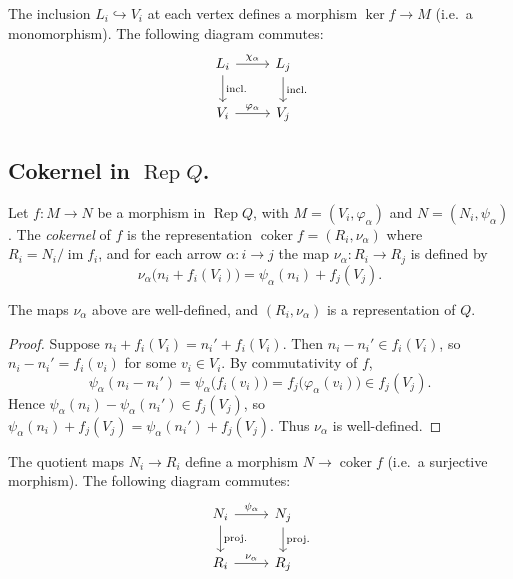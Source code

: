 \documentclass[11pt, a4paper]{report}
\begin{document}
\begin{remark}
    The inclusion \(L_i \hookrightarrow V_i\) at each vertex defines a morphism \(\operatorname{ker}f \to M\) (i.e.\ a monomorphism). The following diagram commutes:
    \[
        \begin{tikzcd}
            L_i \arrow[r, "\chi_\alpha"] \arrow[d, "\mathrm{incl.}"] & L_j \arrow[d, "\mathrm{incl.}"] \\
            V_i \arrow[r, "\varphi_\alpha"] & V_j
        \end{tikzcd}
    \]
\end{remark}

\subsection{Cokernel in \texorpdfstring{\(\operatorname{Rep}Q\)}{Rep Q}.}

\begin{definition}
    Let \(f: M \to N\) be a morphism in \(\operatorname{Rep}Q\), with \(M = (V_i, \varphi_\alpha)\) and \(N = (N_i, \psi_\alpha)\). The \emph{cokernel} of \(f\) is the representation \(\operatorname{coker}f = (R_i, \nu_\alpha)\) where \(R_i = N_i / \operatorname{im}f_i\), and for each arrow \(\alpha: i \to j\) the map \(\nu_\alpha: R_i \to R_j\) is defined by
    \[
        \nu_\alpha\bigl(n_i + f_i(V_i)\bigr) = \psi_\alpha(n_i) + f_j(V_j).
    \]
\end{definition}

\begin{lemma}
    The maps \(\nu_\alpha\) above are well-defined, and \((R_i, \nu_\alpha)\) is a representation of \(Q\).
\end{lemma}
\begin{proof}
    Suppose \(n_i + f_i(V_i) = n_i' + f_i(V_i)\). Then \(n_i - n_i' \in f_i(V_i)\), so \(n_i - n_i' = f_i(v_i)\) for some \(v_i \in V_i\). By commutativity of \(f\),
    \[
        \psi_\alpha(n_i - n_i') = \psi_\alpha\bigl(f_i(v_i)\bigr) = f_j\bigl(\varphi_\alpha(v_i)\bigr) \in f_j(V_j).
    \]
    Hence \(\psi_\alpha(n_i) - \psi_\alpha(n_i') \in f_j(V_j)\), so \(\psi_\alpha(n_i) + f_j(V_j) = \psi_\alpha(n_i') + f_j(V_j)\). Thus \(\nu_\alpha\) is well-defined.
\end{proof}

\begin{remark}
    The quotient maps \(N_i \to R_i\) define a morphism \(N \to \operatorname{coker}f\) (i.e.\ a surjective morphism). The following diagram commutes:
    \[
        \begin{tikzcd}
            N_i \arrow[r, "\psi_\alpha"] \arrow[d, "\mathrm{proj.}"] & N_j \arrow[d, "\mathrm{proj.}"] \\
            R_i \arrow[r, "\nu_\alpha"] & R_j
        \end{tikzcd}
    \]
\end{remark}
\end{document}
